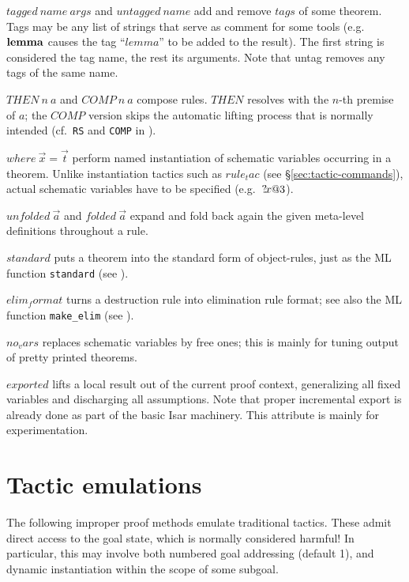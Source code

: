 \begin{descr}
\item [$tagged~name~args$ and $untagged~name$] add and remove $tags$ of some
  theorem.  Tags may be any list of strings that serve as comment for some
  tools (e.g.\ ${\mathord{\mathbf{lemma}}}$ causes the tag ``$lemma$'' to be added to the
  result).  The first string is considered the tag name, the rest its
  arguments.  Note that untag removes any tags of the same name.
\item [$THEN~n~a$ and $COMP~n~a$] compose rules.  $THEN$ resolves with the
  $n$-th premise of $a$; the $COMP$ version skips the automatic lifting
  process that is normally intended (cf.\ \texttt{RS} and \texttt{COMP} in
  \cite[\S5]{isabelle-ref}).
\item [$where~\vec x = \vec t$] perform named instantiation of schematic
  variables occurring in a theorem.  Unlike instantiation tactics such as
  $rule_tac$ (see \S\ref{sec:tactic-commands}), actual schematic variables
  have to be specified (e.g.\ ${?\!x@3}$).
\item [$unfolded~\vec a$ and $folded~\vec a$] expand and fold back again the
  given meta-level definitions throughout a rule.
\item [$standard$] puts a theorem into the standard form of object-rules, just
  as the ML function \texttt{standard} (see \cite[\S5]{isabelle-ref}).
\item [$elim_format$] turns a destruction rule into elimination rule format;
  see also the ML function \texttt{make\_elim} (see \cite{isabelle-ref}).
\item [$no_vars$] replaces schematic variables by free ones; this is mainly
  for tuning output of pretty printed theorems.
\item [$exported$] lifts a local result out of the current proof context,
  generalizing all fixed variables and discharging all assumptions.  Note that
  proper incremental export is already done as part of the basic Isar
  machinery.  This attribute is mainly for experimentation.
\end{descr}


\section{Tactic emulations}\label{sec:tactics}

The following improper proof methods emulate traditional tactics.  These admit
direct access to the goal state, which is normally considered harmful!  In
particular, this may involve both numbered goal addressing (default 1), and
dynamic instantiation within the scope of some subgoal.


